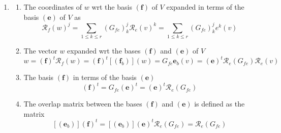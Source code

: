 \documentclass[aps,preprint]{revtex4}
\begin{document}
\begin{enumerate}
\item 
\begin{enumerate}
\item The coordinates of $w$ wrt the basis $\left( \boldsymbol{f}\right) $
of $V$ expanded in terms of the basis $\left( \boldsymbol{e}\right) $ of $V$
as 
\begin{equation}
\mathcal{R}_{f}\left( w\right) ^{j}=\sum_{1\leq k\leq r}\left( G_{fe}\right)
_{k}^{j}\mathcal{R}_{e}\left( v\right) ^{k}=\sum_{1\leq k\leq r}\left(
G_{fe}\right) _{k}^{j}e^{k}\left( v\right)
\end{equation}

\item The vector $w$ expanded wrt the bases $\left( \boldsymbol{f}\right) $
and $\left( \boldsymbol{e}\right) $ of $V$ 
\begin{equation}
w=\left( \boldsymbol{f}\right) ^{t}\mathcal{R}_{f}\left( w\right) =\left( 
\boldsymbol{f}\right) ^{t}\left[ \left( \boldsymbol{f}_{b}\right) \right]
\left( w\right) =G_{fe}\mathbf{e}_{b}\left( v\right) =\left( \boldsymbol{e}%
\right) ^{t}\mathcal{R}_{e}\left( G_{fe}\right) \mathcal{R}_{e}\left(
v\right)
\end{equation}

\item The basis $\left( \boldsymbol{f}\right) $ in terms of the basis $%
\left( \boldsymbol{e}\right) $ 
\begin{equation}
\left( \boldsymbol{f}\right) ^{t}=G_{fe}\left( \boldsymbol{e}\right)
^{t}=\left( \boldsymbol{e}\right) ^{t}\mathcal{R}_{e}\left( G_{fe}\right)
\end{equation}

\item The overlap matrix between the bases $\left( \boldsymbol{f}\right) $
and $\left( \boldsymbol{e}\right) $ is defined as the matrix 
\begin{equation}
\left[ \left( \boldsymbol{e}_{b}\right) \right] \left( \boldsymbol{f}\right)
^{t}=\left[ \left( \boldsymbol{e}_{b}\right) \right] \left( \boldsymbol{e}%
\right) ^{t}\mathcal{R}_{e}\left( G_{fe}\right) =\mathcal{R}_{e}\left(
G_{fe}\right)
\end{equation}


\end{enumerate}
\end{enumerate}
\end{document}
